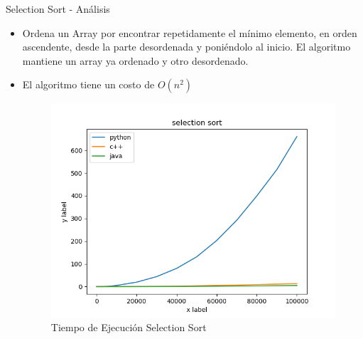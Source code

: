 \documentclass[11pt]{beamer}
\begin{document}
    		\begin{frame}{Selection Sort - Análisis}
    		     \begin{itemize}
    		         \item Ordena un Array por encontrar repetidamente el mínimo elemento, en orden ascendente, desde la parte desordenada y poniéndolo al inicio. El algoritmo mantiene un array ya ordenado y otro desordenado.
    		         \item El algoritmo tiene un costo de $O(n^2)$ \cite{Heineman2008}
    		         
    		         \begin{figure}[H]
        				\centering
        				\includegraphics[scale=0.35]{img/selection_diagram.png}
        				\caption{Tiempo de Ejecución Selection Sort}
        				\label{fig: selection_sort_fig1}
        			\end{figure}
    		         
    		     \end{itemize}
    		    
    		\end{frame}
	
		
\end{document}
